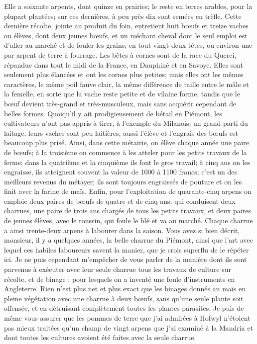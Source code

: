 Elle a soixante arpents, dont quinze en prairies; le reste en terres arables, pour la plupart plantées; sur ces dernières, à peu près dix sont semées en trèfle. Cette dernière récolte, jointe au produit du foin, entretient huit bœufs et treize vaches ou élèves, dont deux jeunes bœufs, et un méchant cheval dont le seul emploi est d'aller au marché et de fouler les grains; en tout vingt-deux têtes, ou environ une par arpent de terre à fourrage. Les bêtes à cornes sont de la race du Querci, répandue dans tout le midi de la France, en Dauphiné et en Savoye. Elles sont seulement plus élancées et ont les cornes plus petites; mais elles ont les mêmes caractères, le même poil fauve clair, la même différence de taille entre le mâle et la femelle, en sorte que la vache reste petite et de vilaine forme, tandis que le bœuf devient très-grand et très-musculeux,\setcounter{page}{404} mais sans acquérir cependant de belles formes. Quoiqu'il y ait prodigieusement de bétail en Piémont, les cultivateurs n'ont pas appris à tirer, à l'exemple du Milanois, un grand parti du laitage; leurs vaches sont peu laitières, aussi l'élève et l'engrais des bœufs est beaucoup plus prisé. Ainsi, dans cette métairie, on élève chaque année une paire de bœufs; à la troisième on commence à les atteler pour les petits travaux de la ferme; dans la quatrième et la cinquième ils font le gros travail; à cinq ans on les engraisse, ils atteignent souvent la valeur de 1000 à 1100 francs; c'est un des meilleurs revenus du métayer; ils sont toujours engraissés de pouture et on les finit avec la farine de maïs. Enfin, pour l'exploitation de quarante-cinq arpens on emploie deux paires de bœufs de quatre et de cinq ans, qui conduisent deux charrues, une paire de trois ans chargés de tous les petits travaux, et deux paires de jeunes élèves, avec le roussin, qui foule le blé et va au marché. Chaque charrue a ainsi trente-deux arpens à labourer dans la saison. Vous avez si bien décrit, monsieur, il y a quelques années, la belle charrue du Piémont, ainsi que l'art avec lequel ces habiles laboureurs savent la manier, que je crois superflu de le répéter\setcounter{page}{405} ici. Je ne puis cependant m'empêcher de vous parler de la manière dont ils sont parvenus à exécuter avec leur seule charrue tous les travaux de culture sur récolte, et de binage ; pour lesquels on a inventé une foule d'instruments en Angleterre. Rien n'est plus net et plus exact que les binages donnés au maïs en pleine végétation avec une charrue à deux bœufs, sans qu'une seule plante soit offensée, et en détruisant complètement toutes les plantes parasites. Je puis de même vous assurer que les pommes de terre que j'ai admirées à Hofwyl n'étoient pas mieux traitées qu'un champ de vingt arpens que j'ai examiné à la Mandria et dont toutes les cultures avoient été faites avec la seule charrue.
